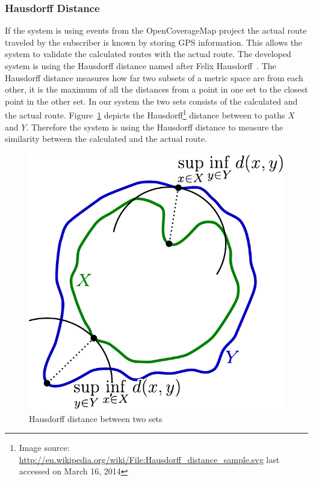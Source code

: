 \documentclass[master,english]{hgbthesis}
\begin{document}
\subsubsection{Hausdorff Distance}
If the system is using events from the OpenCoverageMap project the actual route traveled by the subscriber is known by storing GPS information. This allows the system to validate the calculated routes with the actual route. The developed system is using the Hausdorff distance named after Felix Hausdorff~\cite{Rockafellar1998}. The Hausdorff distance measures how far two subsets of a metric space are from each other, it is the maximum of all the distances from a point in one set to the closest point in the other set. In our system the two sets consists of the calculated and the actual route. Figure~\ref{fig:Hausdorff_distance_sample} depicts the Hausdorff\footnote{Image source: \url{http://en.wikipedia.org/wiki/File:Hausdorff_distance_sample.svg} last accessed on March 16, 2014 } distance between to paths $X$ and $Y$. Therefore the system is using the Hausdorff distance to measure the similarity between the calculated and the actual route.
\begin{figure}
	\centering
	\includegraphics[width=0.7\linewidth]{./images/Hausdorff_distance_sample}
	\caption{Hausdorff distance between two sets}
	\label{fig:Hausdorff_distance_sample}
\end{figure}
\end{document}
